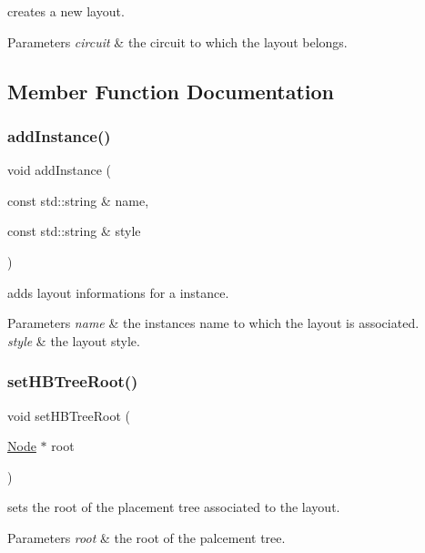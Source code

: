 creates a new layout. 


\begin{DoxyParams}{Parameters}
{\em circuit} & the circuit to which the layout belongs. \\
\hline
\end{DoxyParams}


\subsection{Member Function Documentation}
\mbox{\label{class_open_chams_1_1_layout_a4cc1899e9b782de44700fa0e4ac477ef}} 
\subsubsection{\texorpdfstring{add\+Instance()}{addInstance()}}
{\footnotesize\ttfamily void add\+Instance (\begin{DoxyParamCaption}\item[{const std\+::string \&}]{name,  }\item[{const std\+::string \&}]{style }\end{DoxyParamCaption})}



adds layout informations for a instance. 


\begin{DoxyParams}{Parameters}
{\em name} & the instance\textquotesingle{}s name to which the layout is associated. \\
\hline
{\em style} & the layout style. \\
\hline
\end{DoxyParams}
\mbox{\label{class_open_chams_1_1_layout_a6d828958e0faf1346b27276eab101858}} 
\subsubsection{\texorpdfstring{set\+H\+B\+Tree\+Root()}{setHBTreeRoot()}}
{\footnotesize\ttfamily void set\+H\+B\+Tree\+Root (\begin{DoxyParamCaption}\item[{\hyperlink{class_open_chams_1_1_node}{Node} $\ast$}]{root }\end{DoxyParamCaption})\hspace{0.3cm}{\ttfamily [inline]}}



sets the root of the placement tree associated to the layout. 


\begin{DoxyParams}{Parameters}
{\em root} & the root of the palcement tree. \\
\hline
\end{DoxyParams}
